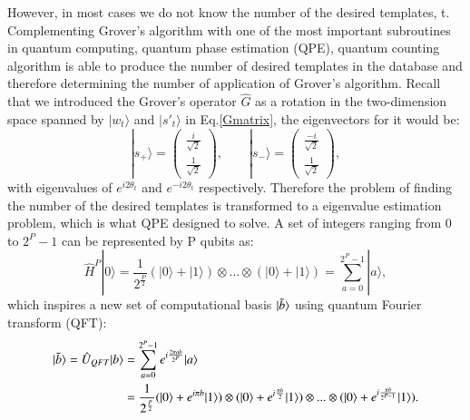 \documentclass[aps,prd,nofootinbib,twocolumn,reprint,superscriptaddress,showpacs,showkeys,longbibliography]{revtex4-1}
\newcommand{\ket}[1]{|#1\rangle}
\begin{document}
However, in most cases we do not know the number of the desired templates, t. %
 Complementing Grover's algorithm with one of the most important subroutines in quantum computing, quantum phase estimation (QPE), quantum counting algorithm is able to produce the number of desired templates in the database and therefore determining the number of application of Grover's algorithm\cite{brassard1998quantum}.    
\newline\newline  Recall that we introduced the Grover's operator $\hat{G}$ as a rotation in the two-dimension space spanned by $\ket{w_t}$ and $\ket{s'_t}$ in Eq.\ref{Gmatrix}, the eigenvectors for it would be:
\begin{equation}
  \label{Geigenvector}  
    \ket{s_+}=\begin{pmatrix}
\frac{i}{\sqrt{2}} \\
\frac{1}{\sqrt{2}}
\end{pmatrix}, \qquad
\ket{s_-}=\begin{pmatrix}
\frac{-i}{\sqrt{2}} \\
\frac{1}{\sqrt{2}}
\end{pmatrix},
\end{equation}
with eigenvalues of $e^{i2\theta_t}$ and $e^{-i2\theta_t}$ respectively. Therefore the problem of finding the number of the desired templates is transformed to a eigenvalue estimation problem, which is what QPE designed to solve.  
\newline \newline A set of integers ranging from  $0$ to $2^P-1$ can be represented by P qubits as:
\begin{equation}
    \label{H0N}
    \hat{H}^P\ket{0}=\frac{1}{2^{\frac{P}{2}}}(\ket{0}+\ket{1})\otimes...\otimes(\ket{0}+\ket{1})=\sum_{a=0}^{2^P-1}\ket{a},
\end{equation}
which inspires a new set of computational basis $\ket{\Tilde{b}}$ using quantum Fourier transform (QFT)\cite{coppersmith2002approximate}:
\begin{equation}
\begin{split}
   \label{QFT}
    \ket{\Tilde{b}}=\hat{U}_{QFT}\ket{b}&=\sum_{a=0}^{2^P-1}e^{i\frac{2\pi ab}{2^P}}\ket{a}\\
    &=\frac{1}{2^{\frac{P}{2}}}(\ket{0}+e^{i\pi b}\ket{1})\otimes(\ket{0}+e^{i\frac{\pi b}{2}}\ket{1})\otimes...\otimes(\ket{0}+e^{i\frac{\pi b}{2^{P-1}}}\ket{1}).
\end{split}
\end{equation}
\end{document}
